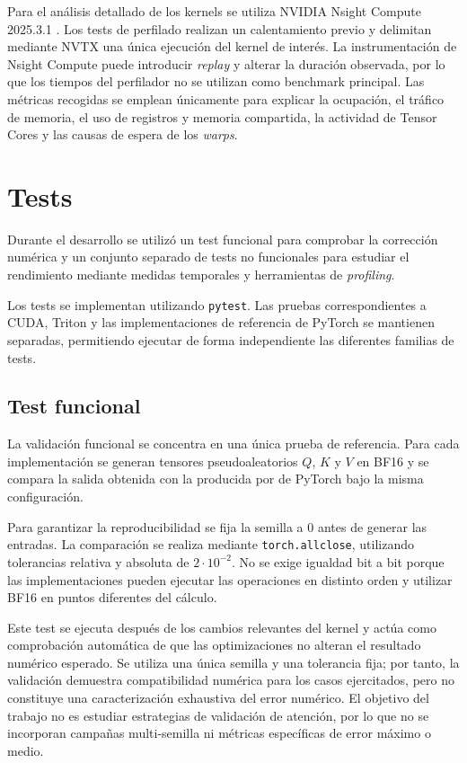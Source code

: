 Para el análisis detallado de los kernels se utiliza NVIDIA Nsight Compute 2025.3.1 \cite{nsightCompute}. Los tests de perfilado realizan un calentamiento previo y delimitan mediante NVTX una única ejecución del kernel de interés. La instrumentación de Nsight Compute puede introducir \textit{replay} y alterar la duración observada, por lo que los tiempos del perfilador no se utilizan como benchmark principal. Las métricas recogidas se emplean únicamente para explicar la ocupación, el tráfico de memoria, el uso de registros y memoria compartida, la actividad de Tensor Cores y las causas de espera de los \textit{warps}.

\chapter{Tests}

Durante el desarrollo se utilizó un test funcional para comprobar la corrección numérica y un conjunto separado de tests no funcionales para estudiar el rendimiento mediante medidas temporales y herramientas de \textit{profiling}.

Los tests se implementan utilizando \texttt{pytest}. Las pruebas correspondientes a CUDA, Triton y las implementaciones de referencia de PyTorch se mantienen separadas, permitiendo ejecutar de forma independiente las diferentes familias de tests.

\section{Test funcional}

La validación funcional se concentra en una única prueba de referencia. Para cada implementación se generan tensores pseudoaleatorios \(Q\), \(K\) y \(V\) en BF16 y se compara la salida obtenida con la producida por  de PyTorch bajo la misma configuración.

Para garantizar la reproducibilidad se fija la semilla a 0 antes de generar las entradas. La comparación se realiza mediante \texttt{torch.allclose}, utilizando tolerancias relativa y absoluta de \(2\cdot10^{-2}\). No se exige igualdad bit a bit porque las implementaciones pueden ejecutar las operaciones en distinto orden y utilizar BF16 en puntos diferentes del cálculo.

Este test se ejecuta después de los cambios relevantes del kernel y actúa como comprobación automática de que las optimizaciones no alteran el resultado numérico esperado. Se utiliza una única semilla y una tolerancia fija; por tanto, la validación demuestra compatibilidad numérica para los casos ejercitados, pero no constituye una caracterización exhaustiva del error numérico. El objetivo del trabajo no es estudiar estrategias de validación de atención, por lo que no se incorporan campañas multi-semilla ni métricas específicas de error máximo o medio.

